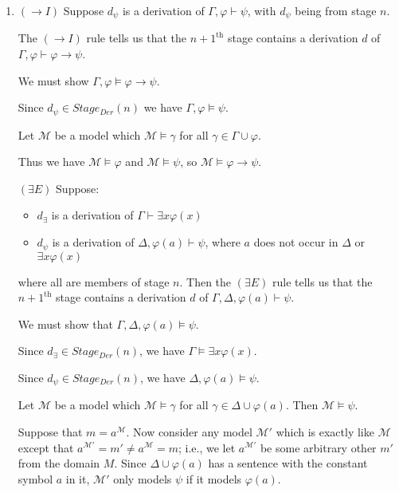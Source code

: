 \documentclass[a4paper]{article}
\newcommand{\MODEL}{\mathcal{M}}
\begin{document}
\begin{enumerate}
    \item $(\to I)$ Suppose $d_{\psi}$ is a derivation of $\Gamma, \varphi \vdash \psi$, with $d_{\psi}$ being from stage $n$.

    The $(\to I)$ rule tells us that the $n + 1^{\text{th}}$ stage contains a derivation $d$ of $\Gamma, \varphi \vdash \varphi \to \psi$.

    We must show $\Gamma, \varphi \models \varphi \to \psi$. 
    
    Since $d_{\psi} \in Stage_{Der}(n)$ we have $\Gamma, \varphi \models \psi$.

    Let $\MODEL$ be a model which $\MODEL \models \gamma$ for all $\gamma \in \Gamma \cup \varphi$.

    Thus we have $\MODEL \models \varphi$ and $\MODEL \models \psi$, so $\MODEL \models \varphi \to \psi$.

    $(\exists E)$ Suppose:
        \begin{itemize}
            \item $d_{\exists}$ is a derivation of $\Gamma \vdash \exists x \varphi (x)$
            \item $d_{\psi}$ is a derivation of $\Delta, \varphi(a) \vdash \psi$, where $a$ does not occur in $\Delta$ or $\exists x \varphi (x)$
        \end{itemize}

        where all are members of stage $n$. Then the $(\exists E)$ rule tells us that the $n + 1^{\text{th}}$ stage contains a derivation $d$ of $\Gamma, \Delta, \varphi (a) \vdash \psi$.

        We must show that $\Gamma, \Delta, \varphi (a) \models \psi$.

        Since $d_{\exists} \in Stage_{Der}(n)$, we have $\Gamma\models \exists x \varphi (x)$.

        Since $d_{\psi} \in Stage_{Der}(n)$, we have $\Delta, \varphi (a) \models \psi$.


    Let $\MODEL$ be a model which $\MODEL \models \gamma$ for all $\gamma \in \Delta \cup \varphi (a)$.
        Then $\MODEL \models \psi$.


        Suppose that $m = a^{\MODEL}$. Now consider any model $\MODEL'$ which is exactly like $\MODEL$ except that $a^{\MODEL'} = m' \neq a^{\MODEL} = m$; i.e., we let $a^{\MODEL'}$ be some arbitrary other $m'$ from the domain $M$. Since $\Delta \cup \varphi (a)$ has a sentence with the constant symbol $a$ in it, $\MODEL'$ only models $\psi$ if it models  $\varphi (a)$.



\end{enumerate}
\end{document}
